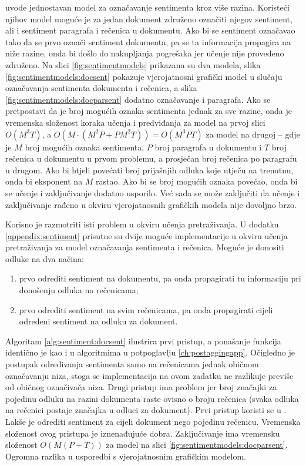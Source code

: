 \citet{mcdonald2007structured} uvode jednostavan model za označavanje sentimenta
kroz više razina. Koristeći njihov model moguće je za jedan dokument združeno
označiti njegov sentiment, ali i sentiment paragrafa i rečenica u dokumentu. Ako
bi se sentiment označavao tako da se prvo označi sentiment dokumenta, pa se ta
informacija propagira na niže razine, onda bi došlo do nakupljanja pogrešaka jer
učenje nije provedeno združeno. Na slici \ref{fig:sentimentmodels} prikazana su
dva modela, slika \ref{fig:sentimentmodels:docsent} pokazuje vjerojatnosni
grafički model u slučaju označavanja sentimenta dokumenta i rečenica, a slika
\ref{fig:sentimentmodels:docparsent} dodatno označavanje i paragrafa. Ako se
pretpostavi da je broj mogućih oznaka sentimenta jednak za sve razine, onda je
vremenska složenost koraka učenja i predviđanja za model na prvoj slici $O(M^3
T)$, a $O(M\cdot(M^2 P + P M^2 T))=O(M^3 P T)$ za model na drugoj -- gdje je $M$
broj mogućih oznaka sentimenta, $P$ broj paragrafa u dokumentu i $T$ broj
rečenica u dokumentu u prvom problemu, a prosječan broj rečenica po paragrafu u
drugom. Ako bi htjeli povećati broj prijašnjih odluka koje utječu na trenutnu,
onda bi eksponent na $M$ rastao. Ako bi se broj mogućih oznaka povećao, onda bi
se učenje i zaključivanje dodatno usporilo. Već sada se može zaključiti da
učenje i zaključivanje rađeno u okviru vjerojatnosnih grafičkih modela nije
dovoljno brzo.

Korisno je razmotriti isti problem u okviru učenja pretraživanja. U dodatku
\ref{appendix:sentiment} prisutne su dvije moguće implementacije u okviru učenja
pretraživanja za model označavanja sentimenta i rečenica. Moguće je donositi
odluke na dva načina:
\begin{enumerate}
  \item prvo odrediti sentiment na dokumentu, pa onda propagirati tu informaciju
  pri donošenju odluka na rečenicama;
  \item prvo odrediti sentiment na svim rečenicama, pa onda propagirati cijeli
  određeni sentiment na odluku za dokument.
\end{enumerate}
Algoritam \ref{alg:sentiment:docsent} ilustrira prvi pristup, a ponašanje
funkcija identično je kao i u algoritmima u potpoglavlju \ref{ch:postaggingapp}.
Očigledno je postupak određivanja sentimenta samo na rečenicama jednak običnom
označavanju niza, stoga se implementacija na ovom zadatku ne razlikuje previše
od običnog označivača niza. Drugi pristup ima problem jer broj značajki za
pojedinu odluku na razini dokumenta raste ovisno o broju rečenica (svaka odluka
na rečenici postaje značajka u odluci za dokument). Prvi pristup koristi se u
\citet{mcdonald2007structured}. Lakše je odrediti sentiment za cijeli dokument
nego pojedinu rečenicu. Vremenska složenost ovog pristupa je iznenađujuće dobra.
Zaključivanje ima vremensku složenost $O(M (P + T))$ za model na slici
\ref{fig:sentimentmodels:docparsent}. Ogromna razlika u usporedbi s
vjerojatnosnim grafičkim modelom.

